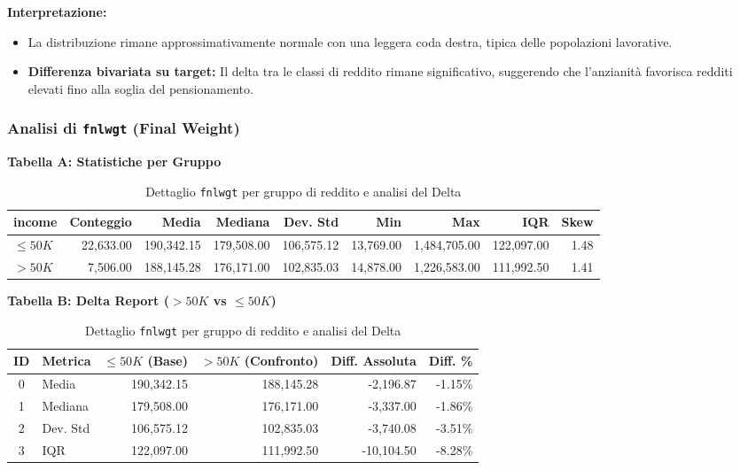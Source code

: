 \noindent
\textbf{Interpretazione:}
\begin{itemize}
    \item La distribuzione rimane approssimativamente normale con una leggera coda destra, tipica delle popolazioni lavorative.
    \item \textbf{Differenza bivariata su target:} Il delta tra le classi di reddito rimane significativo, suggerendo che l'anzianità favorisca redditi elevati fino alla soglia del pensionamento.
\end{itemize}

\newpage
\subsubsection{Analisi di \texttt{fnlwgt} (Final Weight)}

\begin{table}[H]
    \centering
    \footnotesize
    \caption{Dettaglio \texttt{fnlwgt} per gruppo di reddito e analisi del Delta}
    
    \textbf{Tabella A: Statistiche per Gruppo} \\
    \begin{tabular}{lrrrrrrrr}
        \toprule
        \textbf{income} & \textbf{Conteggio} & \textbf{Media} & \textbf{Mediana} & \textbf{Dev. Std} & \textbf{Min} & \textbf{Max} & \textbf{IQR} & \textbf{Skew} \\
        \midrule
        $\leq 50K$ & 22,633.00 & 190,342.15 & 179,508.00 & 106,575.12 & 13,769.00 & 1,484,705.00 & 122,097.00 & 1.48 \\
        $> 50K$ & 7,506.00 & 188,145.28 & 176,171.00 & 102,835.03 & 14,878.00 & 1,226,583.00 & 111,992.50 & 1.41 \\
        \bottomrule
    \end{tabular}

    \vspace{0.4cm}
    
    \textbf{Tabella B: Delta Report ($>50K$ vs $\leq 50K$)} \\
    \begin{tabular}{clrrrr}
        \toprule
        \textbf{ID} & \textbf{Metrica} & \textbf{$\leq 50K$ (Base)} & \textbf{$> 50K$ (Confronto)} & \textbf{Diff. Assoluta} & \textbf{Diff. \%} \\
        \midrule
        0 & Media & 190,342.15 & 188,145.28 & -2,196.87 & -1.15\% \\
        1 & Mediana & 179,508.00 & 176,171.00 & -3,337.00 & -1.86\% \\
        2 & Dev. Std & 106,575.12 & 102,835.03 & -3,740.08 & -3.51\% \\
        3 & IQR & 122,097.00 & 111,992.50 & -10,104.50 & -8.28\% \\
        \bottomrule
    \end{tabular}
\end{table}

